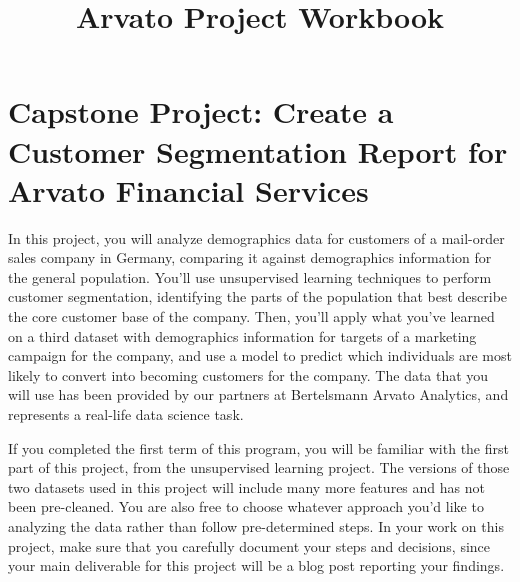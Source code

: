 \documentclass[11pt]{article}
\title{Arvato Project Workbook}
\begin{document}
    
    
    \maketitle
    
    

    
    \section{Capstone Project: Create a Customer Segmentation Report for
Arvato Financial
Services}\label{capstone-project-create-a-customer-segmentation-report-for-arvato-financial-services}

In this project, you will analyze demographics data for customers of a
mail-order sales company in Germany, comparing it against demographics
information for the general population. You'll use unsupervised learning
techniques to perform customer segmentation, identifying the parts of
the population that best describe the core customer base of the company.
Then, you'll apply what you've learned on a third dataset with
demographics information for targets of a marketing campaign for the
company, and use a model to predict which individuals are most likely to
convert into becoming customers for the company. The data that you will
use has been provided by our partners at Bertelsmann Arvato Analytics,
and represents a real-life data science task.

If you completed the first term of this program, you will be familiar
with the first part of this project, from the unsupervised learning
project. The versions of those two datasets used in this project will
include many more features and has not been pre-cleaned. You are also
free to choose whatever approach you'd like to analyzing the data rather
than follow pre-determined steps. In your work on this project, make
sure that you carefully document your steps and decisions, since your
main deliverable for this project will be a blog post reporting your
findings.
\end{document}
